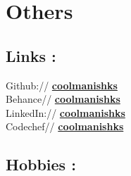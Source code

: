 \documentclass[a4paper]{deedy-resume} %
\begin{document}
\sectionspace %
\section{Others}
\begin{minipage}[t]{0.49\textwidth} 
\subsection{Links : }
Github:// \href{https://github.com/coolmanishks}{\bf coolmanishks} \\
Behance// \href{https://www.behance.net/coolmanishks}{\bf coolmanishks}\\
LinkedIn:// \href{https://www.linkedin.com/in/coolmanishks}{\bf coolmanishks} \\
Codechef// \href{https://www.codechef.com/users/coolmanishks}{\bf coolmanishks}\\
\end{minipage}
\begin{minipage}[t]{0.49\textwidth} 
\subsection{Hobbies : }
 \textbullet{} 
 \textbullet{} 
 \textbullet{} 
 \textbullet{} 
\end{minipage}






\end{document}
